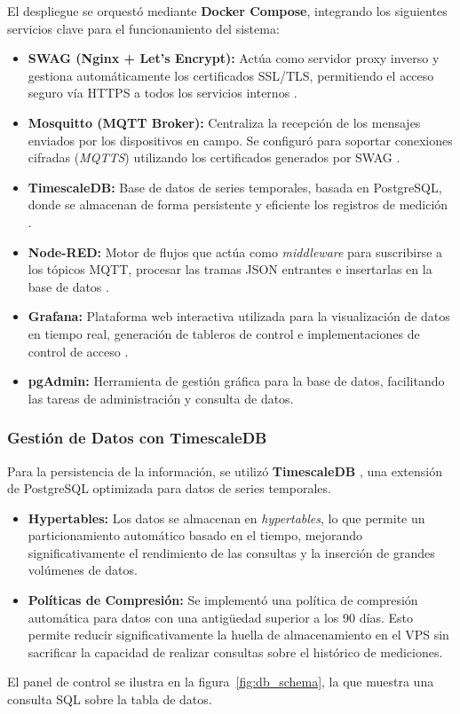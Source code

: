 \documentclass[12pt, a4paper]{article} %
\begin{document}
El despliegue se orquestó mediante \textbf{Docker Compose}, integrando los siguientes servicios clave para el funcionamiento del sistema:

\begin{itemize}
  \item \textbf{SWAG (Nginx + Let's Encrypt):} Actúa como servidor proxy inverso y gestiona automáticamente los certificados SSL/TLS, permitiendo el acceso seguro vía HTTPS a todos los servicios internos \cite{swag_gateway}.
  \item \textbf{Mosquitto (MQTT Broker):} Centraliza la recepción de los mensajes enviados por los dispositivos en campo. Se configuró para soportar conexiones cifradas (\textit{MQTTS}) utilizando los certificados generados por SWAG \cite{eclipse_mosquitto}.
  \item \textbf{TimescaleDB:} Base de datos de series temporales, basada en PostgreSQL, donde se almacenan de forma persistente y eficiente los registros de medición \cite{timescaledb_docs}.
  \item \textbf{Node-RED:} Motor de flujos que actúa como \textit{middleware} para suscribirse a los tópicos MQTT, procesar las tramas JSON entrantes e insertarlas en la base de datos \cite{nodered_platform}.
  \item \textbf{Grafana:} Plataforma web interactiva utilizada para la visualización de datos en tiempo real, generación de tableros de control e implementaciones de control de acceso \cite{grafana_platform}.
  \item \textbf{pgAdmin:} Herramienta de gestión gráfica para la base de datos, facilitando las tareas de administración y consulta de datos.
\end{itemize}

\subsubsection{Gestión de Datos con TimescaleDB}

Para la persistencia de la información, se utilizó \textbf{TimescaleDB} \cite{timescaledb_docs}, una extensión de PostgreSQL optimizada para datos de series temporales.


\begin{itemize}
  \item \textbf{Hypertables:} Los datos se almacenan en \textit{hypertables}, lo que permite un particionamiento automático basado en el tiempo, mejorando significativamente el rendimiento de las consultas y la inserción de grandes volúmenes de datos.
  \item \textbf{Políticas de Compresión:} Se implementó una política de compresión automática para datos con una antigüedad superior a los 90 días. Esto permite reducir significativamente la huella de almacenamiento en el VPS sin sacrificar la capacidad de realizar consultas sobre el histórico de mediciones.
\end{itemize}
El panel de control se ilustra en la figura~\ref{fig:db_schema}, la que muestra una consulta SQL sobre la tabla de datos.
\end{document}
